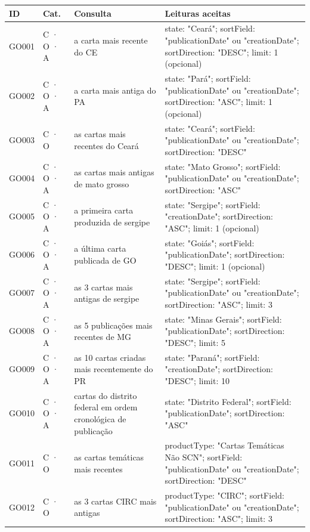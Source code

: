 {\footnotesize
\begin{longtable}{|p{1.1cm}|p{1.3cm}|p{5.4cm}|p{6.3cm}|}
\hline
\textbf{ID} & \textbf{Cat.} & \textbf{Consulta} & \textbf{Leituras aceitas} \\ \hline
\endhead
GO001 & C · O · A & a carta mais recente do CE & state: "Ceará"; sortField: "publicationDate" ou "creationDate"; sortDirection: "DESC"; limit: 1 (opcional) \\ \hline
GO002 & C · O · A & a carta mais antiga do PA & state: "Pará"; sortField: "publicationDate" ou "creationDate"; sortDirection: "ASC"; limit: 1 (opcional) \\ \hline
GO003 & C · O & as cartas mais recentes do Ceará & state: "Ceará"; sortField: "publicationDate" ou "creationDate"; sortDirection: "DESC" \\ \hline
GO004 & C · O · A & as cartas mais antigas de mato grosso & state: "Mato Grosso"; sortField: "publicationDate" ou "creationDate"; sortDirection: "ASC" \\ \hline
GO005 & C · O · A & a primeira carta produzida de sergipe & state: "Sergipe"; sortField: "creationDate"; sortDirection: "ASC"; limit: 1 (opcional) \\ \hline
GO006 & C · O · A & a última carta publicada de GO & state: "Goiás"; sortField: "publicationDate"; sortDirection: "DESC"; limit: 1 (opcional) \\ \hline
GO007 & C · O · A & as 3 cartas mais antigas de sergipe & state: "Sergipe"; sortField: "publicationDate" ou "creationDate"; sortDirection: "ASC"; limit: 3 \\ \hline
GO008 & C · O · A & as 5 publicações mais recentes de MG & state: "Minas Gerais"; sortField: "publicationDate"; sortDirection: "DESC"; limit: 5 \\ \hline
GO009 & C · O · A & as 10 cartas criadas mais recentemente do PR & state: "Paraná"; sortField: "creationDate"; sortDirection: "DESC"; limit: 10 \\ \hline
GO010 & C · O · A & cartas do distrito federal em ordem cronológica de publicação & state: "Distrito Federal"; sortField: "publicationDate"; sortDirection: "ASC" \\ \hline
GO011 & C · O & as cartas temáticas mais recentes & productType: "Cartas Temáticas Não SCN"; sortField: "publicationDate" ou "creationDate"; sortDirection: "DESC" \\ \hline
GO012 & C · O & as 3 cartas CIRC mais antigas & productType: "CIRC"; sortField: "publicationDate" ou "creationDate"; sortDirection: "ASC"; limit: 3 \\ \hline

\end{longtable}}
